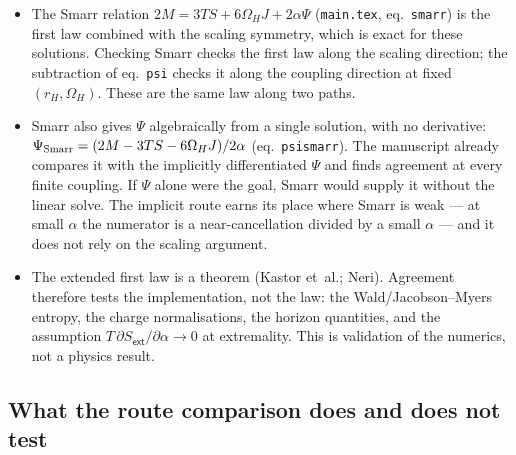 \documentclass[11pt,a4paper]{article}
\newcommand{\q}[1]{\subsection*{\color{accent}#1}}
\newcommand{\ext}{\mathsf{ext}}
\begin{document}
\begin{itemize}\itemsep3pt
  \item The Smarr relation $2M=3TS+6\Omega_HJ+2\alpha\Psi$
  (\texttt{main.tex}, eq.~\texttt{smarr}) is the first law combined with the
  scaling symmetry, which is exact for these solutions. Checking Smarr checks
  the first law along the scaling direction; the subtraction of
  eq.~\texttt{psi} checks it along the coupling direction at fixed
  $(r_H,\Omega_H)$. These are the same law along two paths.
  \item Smarr also gives $\Psi$ algebraically from a single solution, with no
  derivative: $\Psi_{\rm Smarr}=(2M-3TS-6\Omega_HJ)/2\alpha$
  (eq.~\texttt{psismarr}). The manuscript already compares it with the
  implicitly differentiated $\Psi$ and finds agreement at every finite
  coupling. If $\Psi$ alone were the goal, Smarr would supply it without the
  linear solve. The implicit route earns its place where Smarr is weak --- at
  small $\alpha$ the numerator is a near-cancellation divided by a small
  $\alpha$ --- and it does not rely on the scaling argument.
  \item The extended first law is a theorem (Kastor et~al.; Neri). Agreement
  therefore tests the implementation, not the law: the Wald/Jacobson--Myers
  entropy, the charge normalisations, the horizon quantities, and the
  assumption $T\,\partial S_\ext/\partial\alpha\to0$ at extremality. This is
  validation of the numerics, not a physics result.
\end{itemize}

\q{What the route comparison does and does not test}
\end{document}

